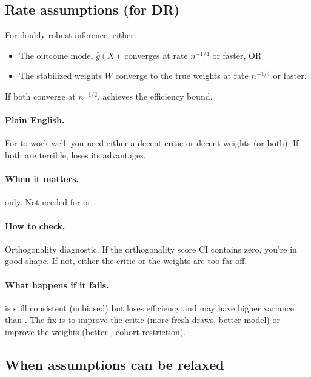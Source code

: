 \subsection{Rate assumptions (for DR)}

\begin{assumption}
\label{assum:rates}
For doubly robust inference, either:
\begin{itemize}
\item The outcome model $\hat{g}(X)$ converges at rate $n^{-1/4}$ or faster, OR
\item The stabilized weights $W$ converge to the true weights at rate $n^{-1/4}$ or faster.
\end{itemize}
If both converge at $n^{-1/2}$, \dr{} achieves the efficiency bound.
\end{assumption}

\paragraph{Plain English.} For \dr{} to work well, you need either a decent critic or decent weights (or both). If both are terrible, \dr{} loses its advantages.

\paragraph{When it matters.} \dr{} only. Not needed for \dm{} or \ips.

\paragraph{How to check.} Orthogonality diagnostic. If the orthogonality score CI contains zero, you're in good shape. If not, either the critic or the weights are too far off.

\paragraph{What happens if it fails.} \dr{} is still consistent (unbiased) but loses efficiency and may have higher variance than \ips. The fix is to improve the critic (more fresh draws, better model) or improve the weights (better \simcal, cohort restriction).

\subsection{When assumptions can be relaxed}

